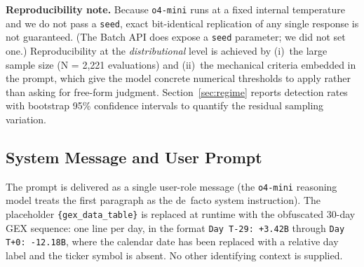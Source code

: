 \noindent\textbf{Reproducibility note.}
Because \texttt{o4-mini} runs at a fixed internal temperature and we do
not pass a \texttt{seed}, exact bit-identical replication of any single
response is not guaranteed. (The Batch API does expose a \texttt{seed}
parameter; we did not set one.) Reproducibility at the \emph{distributional}
level is achieved by
(i)~the large sample size (N = 2{,}221 evaluations) and
(ii)~the mechanical criteria embedded in the prompt, which give the
model concrete numerical thresholds to apply rather than asking for
free-form judgment. Section~\ref{sec:regime} reports detection rates
with bootstrap 95\% confidence intervals to quantify the residual
sampling variation.

\subsection{System Message and User Prompt}
\label{app:prompt:body}

The prompt is delivered as a single user-role message (the
\texttt{o4-mini} reasoning model treats the first paragraph as the
de~facto system instruction). The placeholder
\texttt{\{gex\_data\_table\}} is replaced at runtime with the
obfuscated 30-day GEX sequence: one line per day, in the format
\texttt{Day T-29: +3.42B} through \texttt{Day T+0: -12.18B}, where the
calendar date has been replaced with a relative day label and the
ticker symbol is absent. No other identifying context is supplied.

